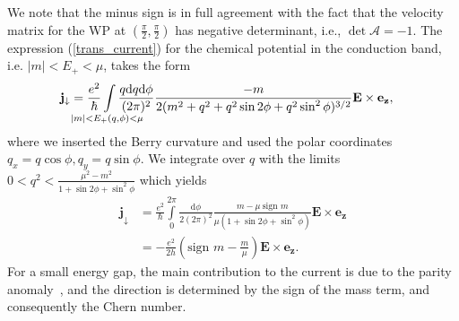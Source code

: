 \documentclass[aps,preprintnumbers,amsmath,amssymb]{revtex4-2}
\begin{document}
We note that the minus sign is in full agreement with the fact that the velocity matrix for the WP at $(\tfrac{\pi}{2},\tfrac{\pi}{2})$ has negative determinant, i.e., $\det \mathcal{A} = -1$.
The expression (\ref{trans_current}) for the chemical potential in the conduction band, i.e. $|m| < E_+ < \mu$, takes the form 
\begin{align}
    \mathbf{j}_{\downarrow}  &= \frac{e^2}{\hbar} \int \limits_{\mathclap{|m| < E_+(q, \phi) < \mu}} \frac{q\text{d}q\text{d}\phi}{(2\pi)^2} \frac{-m}{2(m^2 + q^2 + q^2\sin{2\phi} +q^2\sin^2{\phi})^{3/2}}\mathbf{E} \times \mathbf{e_z},
\end{align}
where we inserted the Berry curvature and used the polar coordinates $q_x = q \cos{\phi}, q_y = q \sin{\phi}$. We integrate over $q$ with the limits $0 < q^2 < \tfrac{\mu^2 - m^2}{1 + \sin{2\phi} + \sin^2{\phi}}$ which yields
\begin{align}
    \mathbf{j}_{\downarrow} &= \frac{e^2}{\hbar} \int \limits_0^{2\pi} \frac{\text{d}\phi}{2(2\pi)^2}  \frac{m - \mu \ \text{sign }m }{\mu (1 + \sin{2\phi} + \sin^2{\phi})}\mathbf{E} \times \mathbf{e_z} \\
    &= - \frac{e^2}{2h}   \left( \text{sign }m - \frac{m}{\mu }\right)\mathbf{E} \times \mathbf{e_z}.
\end{align}
For a small energy gap, the main contribution to the current is due to the parity anomaly~\cite{PhysRevD.29.2366,semenoff_anomaly_PRL}, and the direction is determined by the sign of the mass term, and consequently the Chern number.
\end{document}
